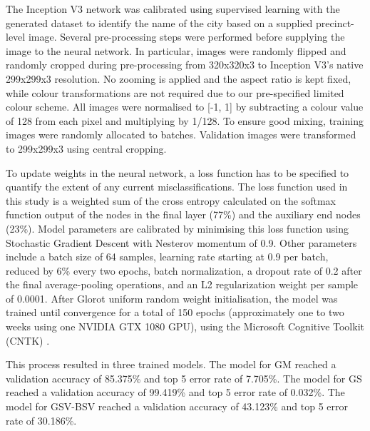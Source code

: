 \documentclass[sageh,times]{sagej}
\begin{document}
The Inception V3 network was calibrated using supervised learning with the generated dataset to identify the name of the city based on a supplied precinct-level image. Several pre-processing steps were performed before supplying the image to the neural network. In particular, images were randomly flipped and randomly cropped during pre-processing from 320x320x3 to Inception V3's native 299x299x3 resolution. No zooming is applied and the aspect ratio is kept fixed, while colour transformations are not required due to our pre-specified limited colour scheme. All images were normalised to [-1, 1] by subtracting a colour value of 128 from each pixel and multiplying by 1/128. To ensure good mixing, training images were randomly allocated to batches. Validation images were transformed to 299x299x3 using central cropping.

To update weights in the neural network, a loss function has to be specified to quantify the extent of any current misclassifications. The loss function used in this study is a weighted sum of the cross entropy calculated on the softmax function output of the nodes in the final layer (77\%) and the auxiliary end nodes (23\%). Model parameters are calibrated by minimising this loss function using Stochastic Gradient Descent with Nesterov momentum of 0.9. Other parameters include a batch size of 64 samples, learning rate starting at 0.9 per batch, reduced by 6\% every two epochs, batch normalization, a dropout rate of 0.2 after the final average-pooling operations, and an L2 regularization weight per sample of 0.0001. After Glorot uniform random weight initialisation, the model was trained until convergence for a total of 150 epochs (approximately one to two weeks using one NVIDIA GTX 1080 GPU), using the Microsoft Cognitive Toolkit (CNTK) \citep{Yu2015}. 

This process resulted in three trained models. The model for GM reached a validation accuracy of 85.375\% and top 5 error rate of 7.705\%. The model for GS reached a validation accuracy of 99.419\% and top 5 error rate of 0.032\%. The model for GSV-BSV reached a validation accuracy of 43.123\% and top 5 error rate of 30.186\%.
\end{document}

